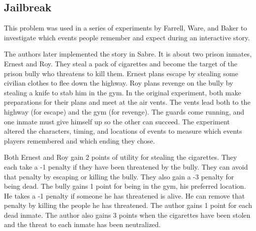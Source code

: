 \documentclass{nilreport}
\makeatletter
\renewcommand{\bibentry}[1]{\nocite{#1}{\frenchspacing\@nameuse{BR@r@#1\@extra@b@citeb}}}
\makeatother
\begin{document}
\subsection{Jailbreak}

This problem was used in a series of experiments by Farrell, Ware,
and Baker to investigate which events people remember and expect during
an interactive story.

\begin{quote}
	\bibentry{farrell2020manipulating}
\end{quote}

\noindent The authors later implemented the story in Sabre. It is
about two prison inmates, Ernest and Roy. They steal a pack of cigarettes
and become the target of the prison bully who threatens to kill them.
Ernest plans escape by stealing some civilian clothes to flee down
the highway. Roy plans revenge on the bully by stealing a knife to
stab him in the gym. In the original experiment, both make preparations
for their plans and meet at the air vents. The vents lead both to
the highway (for escape) and the gym (for revenge). The guards come
running, and one inmate must give himself up so the other can succeed.
The experiment altered the characters, timing, and locations of events
to measure which events players remembered and which ending they chose.

Both Ernest and Roy gain 2 points of utility for stealing the cigarettes.
They each take a -1 penalty if they have been threatened by the bully.
They can avoid that penalty by escaping or killing the bully. They
also gain a -3 penalty for being dead. The bully gains 1 point for
being in the gym, his preferred location. He takes a -1 penalty if
someone he has threatened is alive. He can remove that penalty by
killing the people he has threatened. The author gains 1 point for
each dead inmate. The author also gains 3 points when the cigarettes
have been stolen and the threat to each inmate has been neutralized.

\medskip{}
\noindent{}
\end{document}
